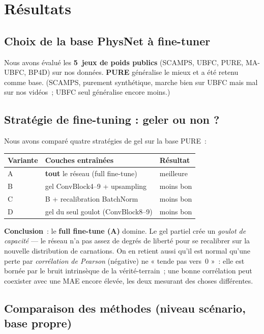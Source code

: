 \documentclass[11pt,a4paper]{article}
\newcommand{\ok}[1]{\textcolor{good}{#1}}
\begin{document}
\section{Résultats}
\label{sec:results}

\subsection{Choix de la base PhysNet à fine-tuner}

Nous avons évalué les \textbf{5~jeux de poids publics} (SCAMPS, UBFC, PURE,
MA-UBFC, BP4D) sur nos données. \textbf{PURE} généralise le mieux et a été retenu
comme base. (SCAMPS, purement synthétique, marche bien sur UBFC mais mal sur nos
vidéos~; UBFC seul généralise encore moins.)

\subsection{Stratégie de fine-tuning : geler ou non ?}

Nous avons comparé quatre stratégies de gel sur la base PURE~:
\begin{center}
\begin{tabular}{@{}lll@{}}
\toprule
Variante & Couches entraînées & Résultat \\
\midrule
A & \textbf{tout} le réseau (full fine-tune) & \ok{meilleure} \\
B & gel ConvBlock4--9 + upsampling & moins bon \\
C & B + recalibration BatchNorm & moins bon \\
D & gel du seul goulot (ConvBlock8--9) & moins bon \\
\bottomrule
\end{tabular}
\end{center}
\textbf{Conclusion}~: le \textbf{full fine-tune (A)} domine. Le gel partiel crée
un \emph{goulot de capacité} --- le réseau n'a pas assez de degrés de liberté pour
se recalibrer sur la nouvelle distribution de carnations. On en retient aussi
qu'il est normal qu'une perte par \emph{corrélation de Pearson} (négative) ne
« tende pas vers~0 »~: elle est bornée par le bruit intrinsèque de la
vérité-terrain~; une bonne corrélation peut coexister avec une MAE encore élevée,
les deux mesurant des choses différentes.

\subsection{Comparaison des méthodes (niveau scénario, base propre)}
\end{document}
